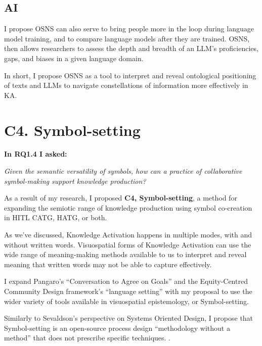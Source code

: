 \subsection{AI}

I propose OSNS can also serve to bring people more in the loop during language model training, and to compare language models after they are trained. OSNS, then allows researchers to assess the depth and breadth of an LLM’s proficiencies, gaps, and biases in a given language domain. 

In short, I propose OSNS as a tool to interpret and reveal ontological positioning of texts and LLMs to navigate constellations of information more effectively in KA. 



\section{C4. Symbol-setting}

\noindent\textbf{In RQ1.4 I asked:}

\textit{Given the semantic versatility of symbols, how can a practice of collaborative symbol-making support knowledge production?}

As a result of my research, I proposed \textbf{C4, Symbol-setting}, a method for expanding the semiotic range of knowledge production using symbol co-creation in HITL CATG, HATG, or both.

\vspace{1em}

As we’ve discussed, Knowledge Activation happens in multiple modes, with and without written words. Visuospatial forms of Knowledge Activation can use the wide range of meaning-making methods available to us to interpret and reveal meaning that written words may not be able to capture effectively.

I expand Pangaro’s “Conversation to Agree on Goals” \citep[p. 185]{pangaro_design_2011} and the Equity-Centred Community Design framework’s “language setting” \citep[p. 8-9]{creative_reaction_lab_equity-centered_2018} with my proposal to use the wider variety of tools available in visuospatial epistemology, or Symbol-setting. 

Similarly to Sevaldson’s perspective on Systems Oriented Design, I propose that Symbol-setting is an open-source process design “methodology without a method” that does not prescribe specific techniques. \citep[p. 30]{sevaldson_designing_2022}.

